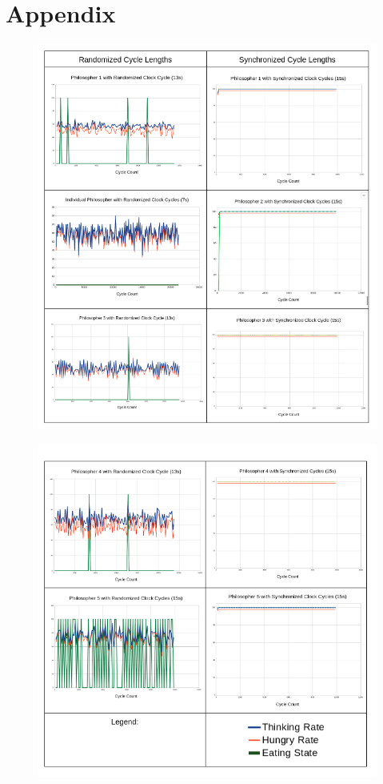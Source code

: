 \documentclass{article}
\begin{document}
\section{Appendix}
\begin{figure}[H]
    \centering
    \includegraphics[scale=0.70]{images/NewGraphs1.png}
\end{figure}
\begin{figure}[H]
    \centering
    \includegraphics[scale=0.7]{images/NewGraphs2.png}
\end{figure}
\end{document}
